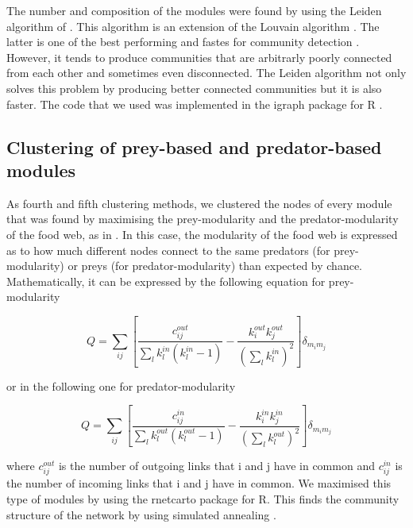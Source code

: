 		The number and composition of the modules were found by using the Leiden algorithm of \citet{Traag2019}. This algorithm is an extension of the Louvain algorithm \citep{Blondel2008}. The latter is one of the best performing and fastes for community detection \citep{Traag2019}. However, it tends to produce communities that are arbitrarly poorly connected from each other and sometimes even disconnected. The Leiden algorithm not only solves this problem by producing better connected communities but it is also faster. The code that we used was implemented in the igraph package \citep{Csardi2006} for R \citep{RDevelopmentCoreTeam2011}.

	\subsection*{Clustering of prey-based and predator-based modules}

		As fourth and fifth clustering methods, we clustered the nodes of every module that was found by maximising the prey-modularity and the predator-modularity of the food web, as in \citet{Guimera2010}. In this case, the modularity of the food web is expressed as to how much different nodes connect to the same predators (for prey-modularity) or preys (for predator-modularity) than expected by chance. Mathematically, it can be expressed by the following equation \citep{Guimera2007} for prey-modularity

						\begin{equation}
							Q=\sum_{ij}{\left[\frac{c_{ij}^{out}}{\sum_{l}{k_l^{in}\left(k_l^{in}-1\right)}}-\frac{k_i^{out}k_j^{out}}{\left(\sum_{l} k_l^{in}\right)^2}\right]\delta_{m_im_j}}
						\end{equation}

		or in the following one for predator-modularity

						\begin{equation}
							Q=\sum_{ij}{\left[\frac{c_{ij}^{in}}{\sum_{l}{k_l^{out}\left(k_l^{out}-1\right)}}-\frac{k_i^{in}k_j^{in}}{\left(\sum_{l} k_l^{out}\right)^2}\right]\delta_{m_im_j}}
						\end{equation}

		\noindent where $c_{ij}^{out}$ is the number of outgoing links that i and j have in common and $c_{ij}^{in}$ is the number of incoming links that i and j have in common.
		We maximised this type of modules by using the rnetcarto package \citep{Doulcier2015} for R. This finds the community structure of the network by using simulated annealing \citep{Kirkpatrick1983}.  %


